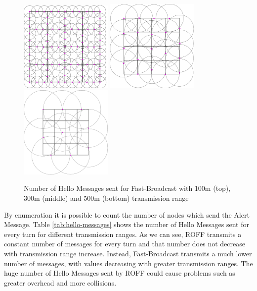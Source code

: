 		\begin{figure}[H]
			\centering
			\includegraphics[width=0.4\textwidth]{immagini/hello-100}
			\includegraphics[width=0.4\textwidth]{immagini/hello-300}
			\includegraphics[width=0.4\textwidth]{immagini/hello-500}
			\caption{Number of Hello Messages sent for Fast-Broadcast with 100m (top), 300m (middle) and 500m (bottom) transmission range}
			\label{fig:hello-fb}
		\end{figure}
		
		By enumeration it is possible to count the number of nodes which send the Alert Message. Table \ref{tab:hello-messages} shows the number of Hello Messages sent for every turn for different transmission ranges. As we can see, ROFF transmits a constant number of messages for every turn and that number does not decrease with transmission range increase. Instead, Fast-Broadcast transmits a much lower number of messages, with values decreasing with greater transmission ranges. The huge number of Hello Messages sent by ROFF could cause problems such as greater overhead and more collisions.
		
